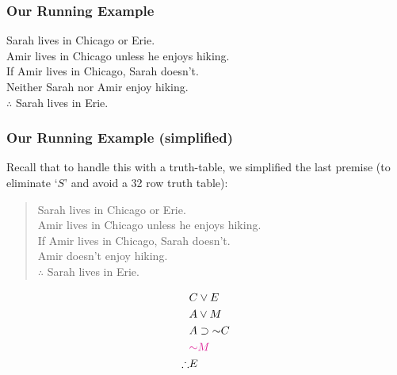 \begin{frame}
  \frametitle{Our Running Example}

  Sarah lives in Chicago or Erie.\\
  Amir lives in Chicago unless he enjoys hiking.\\
  If Amir lives in Chicago, Sarah doesn't.\\
  Neither Sarah nor Amir enjoy hiking.\\
  $\therefore$ Sarah lives in Erie.

\end{frame}

\begin{frame}
  \frametitle{Our Running Example (simplified)}
Recall that to handle this with a truth-table, we simplified the last premise (to eliminate `$S$' and avoid a 32 row truth table): 
\begin{quote}
  Sarah lives in Chicago or Erie.\\
  Amir lives in Chicago unless he enjoys hiking.\\
  If Amir lives in Chicago, Sarah doesn't.\\
  \textcolor{OGlyallpink}{Amir doesn't enjoy hiking}.\\
  $\therefore$ Sarah lives in Erie.
\end{quote}
  \begin{align*}
  & C \eor E\\
  & A \eor M\\
  & A \eif \enot C\\
  &\textcolor{OGlyallpink}{\enot M}\\
  \therefore & E
  \end{align*}
\end{frame}


